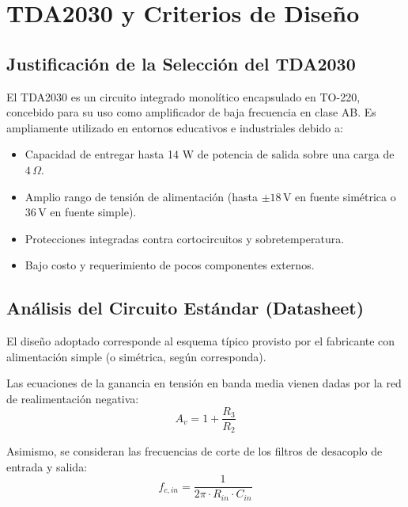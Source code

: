 \section{TDA2030 y Criterios de Diseño}
\subsection{Justificación de la Selección del TDA2030}
El TDA2030 es un circuito integrado monolítico encapsulado en TO-220, concebido para su uso como amplificador de baja frecuencia en clase AB. Es ampliamente utilizado en entornos educativos e industriales debido a:
\begin{itemize}[label=\small\color{primary}$\blacksquare$]
    \item Capacidad de entregar hasta 14 W de potencia de salida sobre una carga de $4\,\Omega$.
    \item Amplio rango de tensión de alimentación (hasta $\pm 18$\,V en fuente simétrica o 36\,V en fuente simple).
    \item Protecciones integradas contra cortocircuitos y sobretemperatura.
    \item Bajo costo y requerimiento de pocos componentes externos.
\end{itemize}

\subsection{Análisis del Circuito Estándar (Datasheet)}
El diseño adoptado corresponde al esquema típico provisto por el fabricante con alimentación simple (o simétrica, según corresponda). 

Las ecuaciones de la ganancia en tensión en banda media vienen dadas por la red de realimentación negativa:
\begin{equation}
    A_v = 1 + \frac{R_3}{R_2}
\end{equation}

Asimismo, se consideran las frecuencias de corte de los filtros de desacoplo de entrada y salida:
\begin{equation}
    f_{c,in} = \frac{1}{2\pi \cdot R_{in} \cdot C_{in}}
\end{equation}